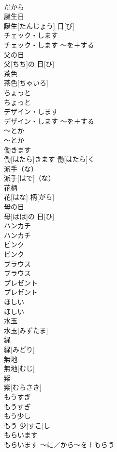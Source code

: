 \documentclass[8pt]{extreport}
\begin{document}
\begin{CJK}{UTF8}{min}
\\	だから		
\\	誕生日	
\\	誕生[たんじょう] 日[び]		
\\	チェック・します	
\\	チェック・します	〜を＋する	
\\	父の日	
\\	父[ちち]の 日[ひ]		
\\	茶色	
\\	茶色[ちゃいろ]		
\\	ちょっと	
\\	ちょっと		
\\	デザイン・します	
\\	デザイン・します	〜を＋する	
\\	〜とか	
\\	〜とか		
\\	働きます	
\\	働[はたら]きます	働[はたら]く	
\\	派手（な）	
\\	派手[はで]（な）		
\\	花柄	
\\	花[はな] 柄[がら]		
\\	母の日	
\\	母[はは]の 日[ひ]		
\\	ハンカチ	
\\	ハンカチ		
\\	ピンク	
\\	ピンク		
\\	ブラウス	
\\	ブラウス		
\\	プレゼント	
\\	プレゼント		
\\	ほしい	
\\	ほしい		
\\	水玉	
\\	水玉[みずたま]		
\\	緑	
\\	緑[みどり]		
\\	無地	
\\	無地[むじ]		
\\	紫	
\\	紫[むらさき]		
\\	もうすぎ	
\\	もうすぎ		
\\	もう少し	
\\	もう 少[すこ]し		
\\	もらいます	
\\	もらいます	〜に／から〜を＋もらう	

\end{CJK}
\end{document}
